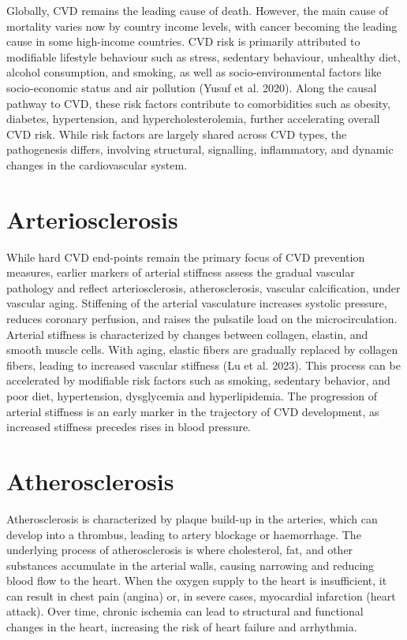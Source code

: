 \documentclass[
  a4paper,
  headsepline=true,
  open=any]{scrbook}
\begin{document}
Globally, CVD remains the leading cause of death. However, the main
cause of mortality varies now by country income levels, with cancer
becoming the leading cause in some high-income countries. CVD risk is
primarily attributed to modifiable lifestyle behaviour such as stress,
sedentary behaviour, unhealthy diet, alcohol consumption, and smoking,
as well as socio-environmental factors like socio-economic status and
air pollution (Yusuf et al. 2020). Along the causal pathway to CVD,
these risk factors contribute to comorbidities such as obesity,
diabetes, hypertension, and hypercholesterolemia, further accelerating
overall CVD risk. While risk factors are largely shared across CVD
types, the pathogenesis differs, involving structural, signalling,
inflammatory, and dynamic changes in the cardiovascular system.


\hypertarget{arteriosclerosis}{%
\chapter{Arteriosclerosis}\label{arteriosclerosis}}

While hard CVD end-points remain the primary focus of CVD prevention
measures, earlier markers of arterial stiffness assess the gradual
vascular pathology and reflect arteriosclerosis, atherosclerosis,
vascular calcification, under vascular aging. Stiffening of the arterial
vasculature increases systolic pressure, reduces coronary perfusion, and
raises the pulsatile load on the microcirculation. Arterial stiffness is
characterized by changes between collagen, elastin, and smooth muscle
cells. With aging, elastic fibers are gradually replaced by collagen
fibers, leading to increased vascular stiffness (Lu et al. 2023). This
process can be accelerated by modifiable risk factors such as smoking,
sedentary behavior, and poor diet, hypertension, dysglycemia and
hyperlipidemia. The progression of arterial stiffness is an early marker
in the trajectory of CVD development, as increased stiffness precedes
rises in blood pressure.


\hypertarget{atherosclerosis}{%
\chapter{Atherosclerosis}\label{atherosclerosis}}

Atherosclerosis is characterized by plaque build-up in the arteries,
which can develop into a thrombus, leading to artery blockage or
haemorrhage. The underlying process of atherosclerosis is where
cholesterol, fat, and other substances accumulate in the arterial walls,
causing narrowing and reducing blood flow to the heart. When the oxygen
supply to the heart is insufficient, it can result in chest pain
(angina) or, in severe cases, myocardial infarction (heart attack). Over
time, chronic ischemia can lead to structural and functional changes in
the heart, increasing the risk of heart failure and arrhythmia.
\end{document}
